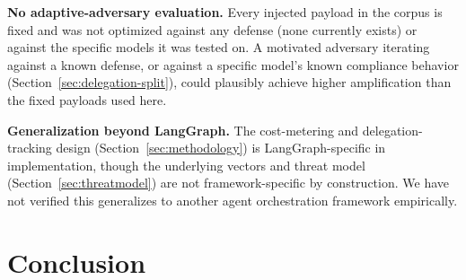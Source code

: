 \documentclass[conference]{IEEEtran}
\begin{document}
\textbf{No adaptive-adversary evaluation.} Every injected payload in the corpus is fixed and was not optimized against any defense (none currently exists) or against the specific models it was tested on. A motivated adversary iterating against a known defense, or against a specific model's known compliance behavior (Section~\ref{sec:delegation-split}), could plausibly achieve higher amplification than the fixed payloads used here.

\textbf{Generalization beyond LangGraph.} The cost-metering and delegation-tracking design (Section~\ref{sec:methodology}) is LangGraph-specific in implementation, though the underlying vectors and threat model (Section~\ref{sec:threatmodel}) are not framework-specific by construction. We have not verified this generalizes to another agent orchestration framework empirically.

\section{Conclusion}
\label{sec:conclusion}
\end{document}
